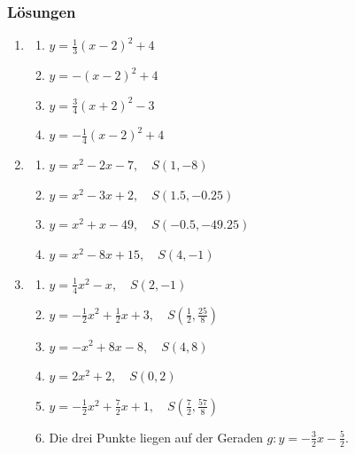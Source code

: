 \subsubsection{Lösungen}
\begin{enumerate}

    \item
          \begin{enumerate}[label=\alph*)]
              \item \( y = \frac{1}{3}(x - 2)^2 + 4 \)
              \item \( y = -(x - 2)^2 + 4 \)
              \item \( y = \frac{3}{4}(x + 2)^2 - 3 \)
              \item\( y = -\frac{1}{4}(x - 2)^2 + 4 \)
          \end{enumerate}

          \vspace{1em}

    \item
          \begin{enumerate}[label=\alph*)]
              \item \( y = x^2 - 2x - 7,\quad S(1, -8) \)
              \item \( y = x^2 - 3x + 2,\quad S(1.5, -0.25) \)
              \item \( y = x^2 + x - 49,\quad S(-0.5, -49.25) \)
              \item \( y = x^2 - 8x + 15,\quad S(4, -1) \)
          \end{enumerate}

    \item
          \begin{enumerate}[label=\alph*)]
              \item \( y = \frac{1}{4}x^2 - x,\quad S(2, -1) \)
              \item \( y = -\frac{1}{2}x^2 + \frac{1}{2}x + 3,\quad S\left(\frac{1}{2} , \frac{25}{8} \right) \)
              \item \( y = -x^2 + 8x - 8,\quad S(4, 8) \)
              \item  \( y = 2x^2 + 2,\quad S(0, 2)\)
              \item \( y = -\frac{1}{2}x^2 + \frac{7}{2}x + 1,\quad S\left(\frac{7}{2} , \frac{57}{8} \right) \)
              \item  Die drei Punkte liegen auf der Geraden \( g : y = -\frac{3}{2}x - \frac{5}{2} \).
          \end{enumerate}
\end{enumerate}
\newpage

